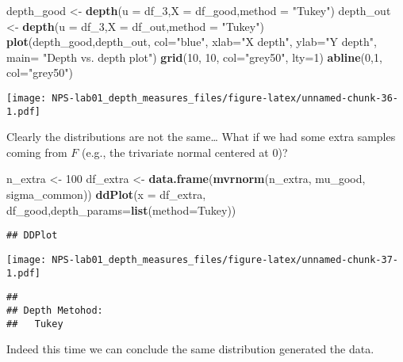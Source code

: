\documentclass[
]{article}
\newenvironment{Shaded}{\begin{snugshade}}{\end{snugshade}}
\newcommand{\AttributeTok}[1]{\textcolor[rgb]{0.13,0.29,0.53}{#1}}
\newcommand{\DecValTok}[1]{\textcolor[rgb]{0.00,0.00,0.81}{#1}}
\newcommand{\FunctionTok}[1]{\textcolor[rgb]{0.13,0.29,0.53}{\textbf{#1}}}
\newcommand{\NormalTok}[1]{#1}
\newcommand{\OtherTok}[1]{\textcolor[rgb]{0.56,0.35,0.01}{#1}}
\newcommand{\StringTok}[1]{\textcolor[rgb]{0.31,0.60,0.02}{#1}}
\begin{document}
\begin{Shaded}
\begin{Highlighting}[]
\NormalTok{depth\_good }\OtherTok{\textless{}{-}} \FunctionTok{depth}\NormalTok{(}\AttributeTok{u =}\NormalTok{ df\_3,}\AttributeTok{X =}\NormalTok{ df\_good,}\AttributeTok{method =} \StringTok{"Tukey"}\NormalTok{)}
\NormalTok{depth\_out }\OtherTok{\textless{}{-}} \FunctionTok{depth}\NormalTok{(}\AttributeTok{u =}\NormalTok{ df\_3,}\AttributeTok{X =}\NormalTok{ df\_out,}\AttributeTok{method =} \StringTok{"Tukey"}\NormalTok{)}
\FunctionTok{plot}\NormalTok{(depth\_good,depth\_out, }\AttributeTok{col=}\StringTok{"blue"}\NormalTok{, }\AttributeTok{xlab=}\StringTok{"X depth"}\NormalTok{, }\AttributeTok{ylab=}\StringTok{"Y depth"}\NormalTok{, }\AttributeTok{main=} \StringTok{"Depth vs. depth plot"}\NormalTok{)}
\FunctionTok{grid}\NormalTok{(}\DecValTok{10}\NormalTok{, }\DecValTok{10}\NormalTok{, }\AttributeTok{col=}\StringTok{"grey50"}\NormalTok{, }\AttributeTok{lty=}\DecValTok{1}\NormalTok{)}
\FunctionTok{abline}\NormalTok{(}\DecValTok{0}\NormalTok{,}\DecValTok{1}\NormalTok{, }\AttributeTok{col=}\StringTok{"grey50"}\NormalTok{)}
\end{Highlighting}
\end{Shaded}

\texttt{[image: NPS-lab01\_depth\_measures\_files/figure-latex/unnamed-chunk-36-1.pdf]}

Clearly the distributions are not the same\ldots{} What if we had some
extra samples coming from \(F\) (e.g., the trivariate normal centered at
\(0\))?

\begin{Shaded}
\begin{Highlighting}[]
\NormalTok{n\_extra }\OtherTok{\textless{}{-}} \DecValTok{100}
\NormalTok{df\_extra }\OtherTok{\textless{}{-}} \FunctionTok{data.frame}\NormalTok{(}\FunctionTok{mvrnorm}\NormalTok{(n\_extra, mu\_good, sigma\_common))}
\FunctionTok{ddPlot}\NormalTok{(}\AttributeTok{x =}\NormalTok{ df\_extra, df\_good,}\AttributeTok{depth\_params=}\FunctionTok{list}\NormalTok{(}\AttributeTok{method=}\StringTok{\textquotesingle{}Tukey\textquotesingle{}}\NormalTok{))}
\end{Highlighting}
\end{Shaded}

\begin{verbatim}
## DDPlot
\end{verbatim}

\texttt{[image: NPS-lab01\_depth\_measures\_files/figure-latex/unnamed-chunk-37-1.pdf]}

\begin{verbatim}
## 
## Depth Metohod:
##   Tukey
\end{verbatim}

Indeed this time we can conclude the same distribution generated the
data.
\end{document}
